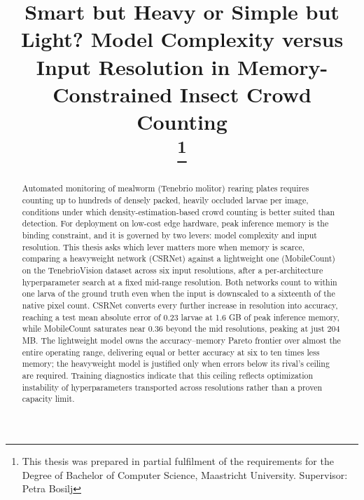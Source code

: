 \documentclass[conference]{IEEEtran}
\begin{document}
\title{Smart but Heavy or Simple but Light? Model Complexity versus Input
Resolution in Memory-Constrained Insect Crowd Counting\\
\thanks{This thesis was prepared in partial fulfilment of the requirements for the Degree of Bachelor of Computer Science, Maastricht University. Supervisor: Petra Bosilj}
}

\author{
}

\maketitle

\begin{abstract}
Automated monitoring of mealworm (Tenebrio molitor) rearing plates requires
counting up to hundreds of densely packed, heavily occluded larvae per image,
conditions under which density-estimation-based crowd counting is better
suited than detection. For deployment on low-cost edge hardware, peak
inference memory is the binding constraint, and it is governed by two levers:
model complexity and input resolution. This thesis asks which lever matters
more when memory is scarce, comparing a heavyweight network (CSRNet) against
a lightweight one (MobileCount) on the TenebrioVision dataset across six input
resolutions, after a per-architecture hyperparameter search at a fixed
mid-range resolution. Both networks count to within one larva of the ground
truth even when the input is downscaled to a sixteenth of the native pixel
count. CSRNet converts every further increase in resolution into accuracy,
reaching a test mean absolute error of 0.23 larvae at 1.6 GB of peak inference
memory, while MobileCount saturates near 0.36 beyond the mid resolutions,
peaking at just 204 MB. The lightweight model owns the accuracy--memory
Pareto frontier over almost the entire operating range, delivering equal or
better accuracy at six to ten times less memory; the heavyweight model is
justified only when errors below its rival's ceiling are required. Training
diagnostics indicate that this ceiling reflects optimization instability of
hyperparameters transported across resolutions rather than a proven capacity
limit.
\end{abstract}
\end{document}
